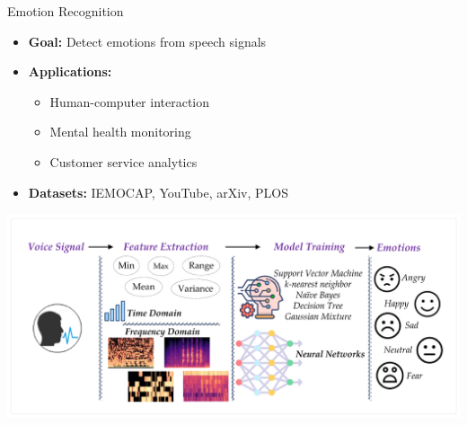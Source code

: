 \begin{frame}[allowframebreaks]{Emotion Recognition}
    \begin{itemize}
        \item \textbf{Goal:} Detect emotions from speech signals
        \item \textbf{Applications:}
            \begin{itemize}
                \item Human-computer interaction
                \item Mental health monitoring
                \item Customer service analytics
            \end{itemize}
        \item \textbf{Datasets:} IEMOCAP, YouTube, arXiv, PLOS
    \end{itemize}
    \begin{center}
        \includegraphics[width=\textwidth]{images/audio-nlp/emotion_classes.png}
    \end{center}
\end{frame}

